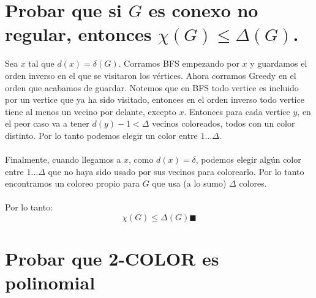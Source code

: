 \documentclass[11pt, a4paper]{article}
\theoremstyle{definition}
\begin{document}
\section{Probar que si $G$ es conexo no regular, entonces $\chi(G)\leq \Delta(G)$.}

Sea $x$ tal que $d(x)=\delta(G)$. Corramos BFS empezando por $x$ y guardamos el orden inverso en el que se visitaron los vértices.
Ahora corramos Greedy en el orden que acabamos de guardar. Notemos que en BFS todo vertice es incluido por un vertice que ya ha sido visitado, entonces en el orden 
inverso todo vertice tiene al menos un vecino por delante, excepto $x$. Entonces para cada vertice $y$, en el peor caso va a tener $d(y)-1 < \Delta$ vecinos coloreados,
todos con un color distinto. Por lo tanto podemos elegir un color entre $1 \ldots \Delta$.\\ \\ 
Finalmente, cuando llegamos a $x$, como $d(x)=\delta$, podemos elegir algún color 
entre $1 \ldots \Delta$ que no haya sido usado por sus vecinos para colorearlo. Por lo tanto encontramos un coloreo propio para $G$ que usa (a lo sumo) $\Delta$ colores.\\ \\
Por lo tanto:
\[
\chi(G) \leq \Delta(G) \blacksquare
\]

\section{Probar que 2-COLOR es polinomial}
\end{document}
